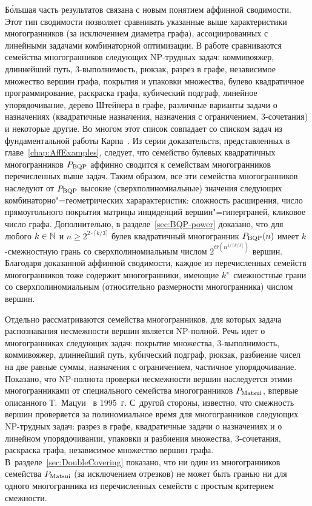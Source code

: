 Б\'{о}льшая часть результатов связана с новым понятием аффинной сводимости. 
Этот тип сводимости позволяет сравнивать указанные выше характеристики многогранников (за исключением диаметра графа), ассоциированных с линейными задачами комбинаторной оптимизации. В работе сравниваются семейства многогранников следующих NP-трудных задач: коммивояжер, длиннейший путь, 3-выполнимость, рюкзак, разрез в графе, независимое множество вершин графа, покрытия и упаковки множества, булево квадратичное программирование, раскраска графа, кубический подграф, линейное упорядочивание, дерево Штейнера в графе, различные варианты задачи о назначениях (квадратичные назначения, назначения с ограничением, 3-сочетания) и некоторые другие.
Во многом этот список совпадает со списком задач из фундаментальной работы Карпа~\cite{Karp:1972}. Из серии доказательств, представленных в главе~\ref{chap:AffExamples}, следует, что семейство булевых квадратичных многогранников $P_{\textup{BQP}}$ аффинно сводится к семействам многогранников перечисленных выше задач.
Таким образом, все эти семейства многогранников наследуют от $P_{\textup{BQP}}$ высокие (сверхполиномиальные) значения следующих комбинаторно"=геометрических харарактеристик: сложность расширения, число прямоугольного покрытия матрицы инциденций вершин"=гиперграней, кликовое число графа. Дополнительно, в разделе~\ref{sec:BQP-power} доказано, что для любого $k \in \mathbb{N}$ и $n \ge 2^{2\cdot \lceil k/3\rceil}$ булев квадратичный многогранник $P_{\textup{BQP}}(n)$ имеет $k$-смежностную грань со сверхполиномиальным числом $2^{{\Theta}\left( n^{1 / {\left\lceil k/3\right\rceil}}\right)}$ вершин. Благодаря доказанной аффинной сводимости, каждое из перечисленных семейств многогранников тоже содержит многогранники, имеющие $k$"~смежностные грани со сверхполиномиальным (относительно размерности многогранника) числом вершин.

Отдельно рассматриваются семейства многогранников, для которых задача распознавания несмежности вершин является NP-полной. Речь идет о многогранниках следующих задач: покрытие множества, 3-выполнимость, коммивояжер, длиннейший путь, кубический подграф, рюкзак, разбиение чисел на две равные суммы, назначения с ограничением, частичное упорядочивание. Показано, что NP-полнота проверки несмежности вершин наследуется этими многогранниками от специального семейства многогранников $P_{\textup{Matsui}}$, впервые описанного Т.~Мацуи~\cite{Matsui:1995} в 1995~г. С~другой стороны, известно, что смежность вершин проверяется за полиномиальное время для многогранников следующих NP-трудных задач: разрез в графе, квадратичные задачи о назначениях и о линейном упорядочивании, упаковки и разбиения множества, 3-сочетания, раскраска графа, независимое множество вершин графа. В~разделе~\ref{sec:DoubleCovering} показано, что ни один из многогранников семейства $P_{\textup{Matsui}}$ (за исключением отрезков) не может быть гранью ни для одного многогранника из перечисленных семейств с простым критерием смежности.


